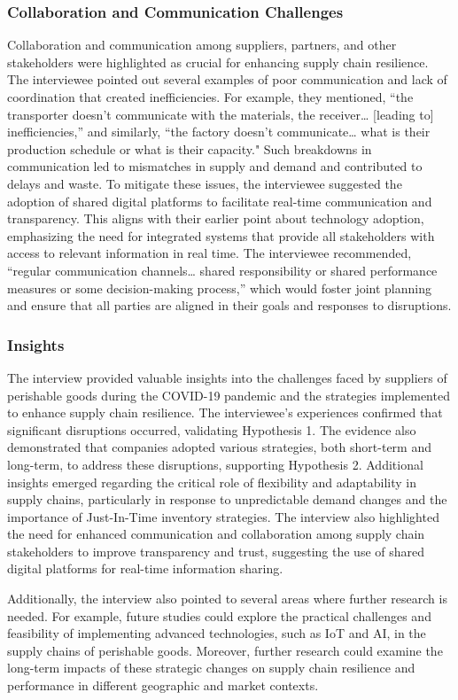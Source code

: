 \subsubsection{Collaboration and Communication Challenges}
Collaboration and communication among suppliers, partners, and other stakeholders were highlighted as crucial for enhancing supply chain resilience. The interviewee pointed out several examples of poor communication and lack of coordination that created inefficiencies. For example, they mentioned, “the transporter doesn’t communicate with the materials, the receiver… [leading to] inefficiencies,” and similarly, “the factory doesn’t communicate… what is their production schedule or what is their capacity." Such breakdowns in communication led to mismatches in supply and demand and contributed to delays and waste. To mitigate these issues, the interviewee suggested the adoption of shared digital platforms to facilitate real-time communication and transparency. This aligns with their earlier point about technology adoption, emphasizing the need for integrated systems that provide all stakeholders with access to relevant information in real time. The interviewee recommended, “regular communication channels… shared responsibility or shared performance measures or some decision-making process,” which would foster joint planning and ensure that all parties are aligned in their goals and responses to disruptions.

\subsubsection{Insights}

The interview provided valuable insights into the challenges faced by suppliers of perishable goods during the COVID-19 pandemic and the strategies implemented to enhance supply chain resilience. The interviewee's experiences confirmed that significant disruptions occurred, validating Hypothesis 1. The evidence also demonstrated that companies adopted various strategies, both short-term and long-term, to address these disruptions, supporting Hypothesis 2. Additional insights emerged regarding the critical role of flexibility and adaptability in supply chains, particularly in response to unpredictable demand changes and the importance of Just-In-Time inventory strategies. The interview also highlighted the need for enhanced communication and collaboration among supply chain stakeholders to improve transparency and trust, suggesting the use of shared digital platforms for real-time information sharing.

Additionally, the interview also pointed to several areas where further research is needed. For example, future studies could explore the practical challenges and feasibility of implementing advanced technologies, such as IoT and AI, in the supply chains of perishable goods. Moreover, further research could examine the long-term impacts of these strategic changes on supply chain resilience and performance in different geographic and market contexts.

